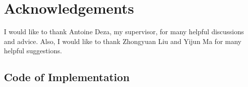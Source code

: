 \documentclass[11pt]{article}
\begin{document}
\section{Acknowledgements}
I would like to thank Antoine Deza, my supervisor, for many helpful discussions and advice. Also, I would like to thank Zhongyuan Liu and Yijun Ma for many helpful suggestions.

\newpage




\newpage
\appendix
\renewcommand{\thesection}{\Alph{section}.\arabic{section}}
\setcounter{section}{0}

\begin{appendices}
\section*{Code of Implementation}
\\
\\
\\
\\
\end{appendices}
\end{document}
